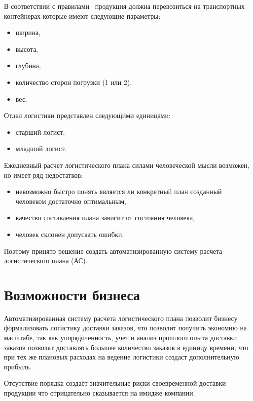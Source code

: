 В соответствии с правилами~\cite{dr} продукция должна перевозиться на транспортных контейнерах которые имеют следующие параметры:
\begin{itemize}
    \item ширина,
    \item высота,
    \item глубина,
    \item количество сторон погрузки (1 или 2),
    \item вес.
\end{itemize}

Отдел логистики представлен следующими единицами:
\begin{itemize}
    \item старший логист,
    \item младший логист.
\end{itemize}

Ежедневный расчет логистического плана силами человеческой мысли возможен, но имеет ряд недостатков:
\begin{itemize}
    \item невозможно быстро понять является ли конкретный план созданный человеком достаточно оптимальным,
    \item качество составления плана зависит от состояния человека,
    \item человек склонен допускать ошибки.
\end{itemize}

Поэтому принято решение создать автоматизированную систему расчета логистического плана (АС).


\section{Возможности бизнеса}
\label{sec:possibilities}

Автоматизированная систему расчета логистического плана позволит бизнесу формализовать логистику доставки заказов,
что позволит получить экономию на масштабе, так как упорядоченность, учет и анализ прошлого опыта доставки заказов позволят
доставлять большее количество заказов в единицу времени, что при тех же плановых расходах на ведение логистики создаст дополнительную прибыль.

Отсутствие порядка создаёт значительные риски своевременной доставки продукции что отрицательно сказывается на имидже компании.

